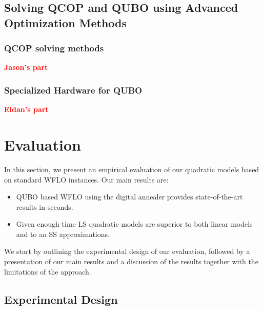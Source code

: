 \documentclass[preprint,12pt]{elsarticle}
\newcommand{\todo}[1]{{\textcolor{red}{\bf {#1}}}}
\begin{document}
\subsection{Solving QCOP and QUBO using Advanced Optimization Methods}

\subsubsection{QCOP solving methods}

\todo{Jason's part}

\subsubsection{Specialized Hardware for QUBO}

\todo{Eldan's part}


\section{Evaluation}
\label{sec:eval}

In this section, we 
present an empirical evaluation of our quadratic models based on 
standard WFLO instances.
Our main results are: \begin{itemize}
	\item QUBO based WFLO using the digital annealer provides state-of-the-art results in seconds.
	\item Given enough time LS quadratic models are superior to both linear models and to an SS approximations. 
\end{itemize}
We start by outlining the experimental design of our evaluation, followed by a presentation of our main results
and a discussion of the results together with the limitations of the approach.

\subsection{Experimental Design}
\end{document}
